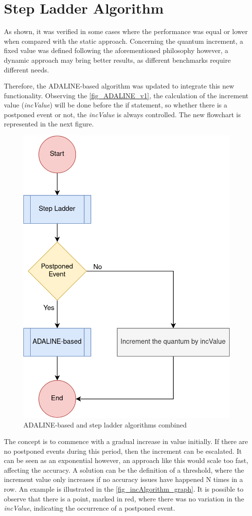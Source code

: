 \section{Step Ladder Algorithm}

As shown, it was verified in some cases where the performance was equal or lower when compared with the static approach. Concerning the quantum 
increment, a fixed value was defined following the aforementioned philosophy however, a dynamic approach may bring better results, as different 
benchmarks require different needs. 

Therefore, the ADALINE-based algorithm was updated to integrate this new functionality. Observing the \autoref{fig_ADALINE_v1}, the calculation of the 
increment value (\textit{incValue}) will be done before the if statement, so whether there is a postponed event or not, the \textit{incValue} is always controlled. 
The new flowchart is represented in the next figure.

\begin{figure}[H]
	\centering
 	\includegraphics[width=0.4\linewidth]{Images/ADALINE_v2.png}
 	\caption{ADALINE-based and step ladder algorithms combined}
	 \label{fig_ADALINE_v2}
\end{figure}

The concept is to commence with a gradual increase in value initially. If there are no postponed events during this period, then the increment 
can be escalated. It can be seen as an exponential however, an approach like this would scale too fast, affecting the accuracy. A solution can be 
the definition of a threshold, where the increment value only increases if no accuracy issues have happened N times in a row. An example is 
illustrated in the \autoref{fig_incAlgorithm_graph}. It is possible to observe that there is a point, marked in red, 
where there was no variation in the \textit{incValue}, indicating the occurrence of a postponed event.

